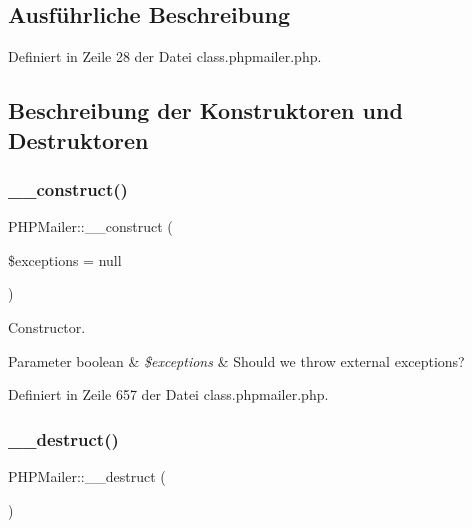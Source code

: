 \subsection{Ausführliche Beschreibung}


Definiert in Zeile 28 der Datei class.\+phpmailer.\+php.



\subsection{Beschreibung der Konstruktoren und Destruktoren}
\mbox{\label{class_p_h_p_mailer_a0ecb02fb405337bb4d66e56d3651b30f}} 
\subsubsection{\texorpdfstring{\+\_\+\+\_\+construct()}{\_\_construct()}}
{\footnotesize\ttfamily P\+H\+P\+Mailer\+::\+\_\+\+\_\+construct (\begin{DoxyParamCaption}\item[{}]{\$exceptions = {\ttfamily null} }\end{DoxyParamCaption})}

Constructor. 
\begin{DoxyParams}[1]{Parameter}
boolean & {\em \$exceptions} & Should we throw external exceptions? \\
\hline
\end{DoxyParams}


Definiert in Zeile 657 der Datei class.\+phpmailer.\+php.

\mbox{\label{class_p_h_p_mailer_aab0f23b3b419bfa0090281530e926a56}} 
\subsubsection{\texorpdfstring{\+\_\+\+\_\+destruct()}{\_\_destruct()}}
{\footnotesize\ttfamily P\+H\+P\+Mailer\+::\+\_\+\+\_\+destruct (\begin{DoxyParamCaption}{ }\end{DoxyParamCaption})}

